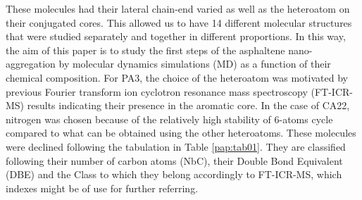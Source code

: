 These molecules had their lateral chain-end varied as well as the heteroatom on their conjugated cores. This allowed us to have 14 different molecular structures that were studied separately and together in different proportions. In this way, the aim of this paper is to study the first steps of the asphaltene nano-aggregation by molecular dynamics simulations (MD) as a function of their chemical composition. For PA3, the choice of the heteroatom was motivated by previous  Fourier transform ion cyclotron resonance mass spectroscopy (FT-ICR-MS) results indicating their presence in the aromatic core.\cite{kim2009automated,stanford2007compositional} In the case of CA22, nitrogen was chosen because of the relatively high stability of 6-atoms cycle compared to what can be obtained using the other heteroatoms. These molecules were declined following the tabulation in Table \ref{pap:tab01}. They are classified following their number of carbon atoms (NbC), their Double Bond Equivalent (DBE) and the Class to which they belong accordingly to FT-ICR-MS, \cite{kendrick1963mass,hughey2001kendrick,shi2010characterization} which indexes might be of use for further referring.

